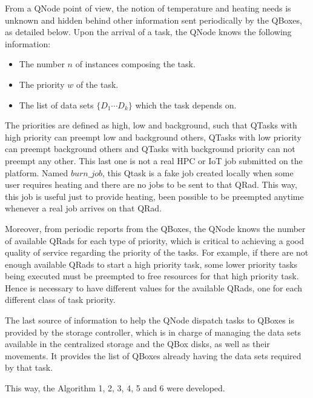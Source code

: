 From a QNode point of view, the notion of temperature and heating needs is unknown and hidden behind other information sent periodically by the QBoxes, as detailed below. Upon the arrival of a task, the QNode knows the following information:
\begin{itemize}
    \item The number $n$ of instances composing the task.
    \item The priority $w$ of the task.
    \item The list of data sets $\{D_1 \cdots D_k \}$ which the task depends on.
\end{itemize}

The priorities are defined as high, low and background, such that QTasks with high priority can preempt low and background others, QTasks with low priority can preempt background others and QTasks with background priority can not preempt any other. This last one is not a real HPC or IoT job submitted on the platform. Named $burn\_job$, this Qtask is a fake job created locally when some user requires heating and there are no jobs to be sent to that QRad. This way, this job is useful just to provide heating, been possible to be preempted anytime whenever a real job arrives on that QRad.

Moreover, from periodic reports from the QBoxes, the QNode knows the number of available QRads for each type of priority, which is critical to achieving a good quality of service regarding the priority of the tasks.
For example, if there are not enough available QRads to start a high priority task, some lower priority tasks being executed must be preempted to free resources for that high priority task.
Hence is necessary to have different values for the available QRads, one for each different class of task priority.

The last source of information to help the QNode dispatch tasks to QBoxes is provided by the storage controller, which is in charge of managing the data sets available in the centralized storage and the QBox disks, as well as their movements.
It provides the list of QBoxes already having the data sets required by that task.
\begin{comment}
        

\Cref{alg:StandardSched}, \Cref{alg:LocalityBasedSched}, \Cref{alg:FullReplicateSched}, \Cref{alg:3ReplicateSched} and \Cref{alg:10ReplicateSched} 
\end{comment}
This way, the Algorithm 1, 2, 3, 4, 5 and 6 were developed.

